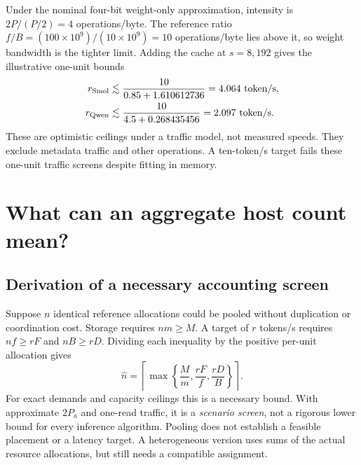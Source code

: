 \documentclass[11pt]{article}
\begin{document}
Under the nominal four-bit weight-only approximation, intensity is $2P/(P/2)=4$ operations/byte. The reference ratio $f/B=(100\times10^9)/(10\times10^9)=10$ operations/byte lies above it, so weight bandwidth is the tighter limit. Adding the cache at $s=8{,}192$ gives the illustrative one-unit bounds
\begin{align}
r_{\rm Smol}&\lesssim\frac{10}{0.85+1.610612736}=4.064\ \mathrm{token/s},\\
r_{\rm Qwen}&\lesssim\frac{10}{4.5+0.268435456}=2.097\ \mathrm{token/s}.
\end{align}
These are optimistic ceilings under a traffic model, not measured speeds. They exclude metadata traffic and other operations. A ten-token/s target fails these one-unit traffic screens despite fitting in memory.

\section{What can an aggregate host count mean?}
\subsection{Derivation of a necessary accounting screen}
Suppose $n$ identical reference allocations could be pooled without duplication or coordination cost. Storage requires $nm\ge M$. A target of $r$ tokens/s requires $nf\ge rF$ and $nB\ge rD$. Dividing each inequality by the positive per-unit allocation gives
\begin{equation}\label{eq:screen}
\widehat n=\left\lceil\max\left\{\frac M m,\frac{rF}f,\frac{rD}B\right\}\right\rceil.
\end{equation}
For exact demands and capacity ceilings this is a necessary bound. With approximate $2P_a$ and one-read traffic, it is a \emph{scenario screen}, not a rigorous lower bound for every inference algorithm. Pooling does not establish a feasible placement or a latency target. A heterogeneous version uses sums of the actual resource allocations, but still needs a compatible assignment.
\end{document}
